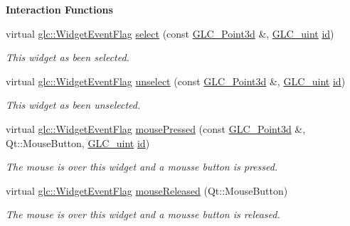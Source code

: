 \begin{Indent}{\bf Interaction Functions}\par
\begin{DoxyCompactItemize}
\item 
virtual \hyperlink{namespaceglc_a7a4a1e3955352aeb2d018746fbe626d5}{glc\-::\-Widget\-Event\-Flag} \hyperlink{class_g_l_c___axis_a9af849a20df4efecbbff677f4741e690}{select} (const \hyperlink{glc__vector3d_8h_a4e13a9bbc7ab3d34de7e98b41836772c}{G\-L\-C\-\_\-\-Point3d} \&, \hyperlink{glc__global_8h_abf950976fabed69026558df8e2da6c6b}{G\-L\-C\-\_\-uint} \hyperlink{glext_8h_a58c2a664503e14ffb8f21012aabff3e9}{id})
\begin{DoxyCompactList}\small\item\em This widget as been selected. \end{DoxyCompactList}\item 
virtual \hyperlink{namespaceglc_a7a4a1e3955352aeb2d018746fbe626d5}{glc\-::\-Widget\-Event\-Flag} \hyperlink{class_g_l_c___axis_a5132ac0942bca529a0f802811670113d}{unselect} (const \hyperlink{glc__vector3d_8h_a4e13a9bbc7ab3d34de7e98b41836772c}{G\-L\-C\-\_\-\-Point3d} \&, \hyperlink{glc__global_8h_abf950976fabed69026558df8e2da6c6b}{G\-L\-C\-\_\-uint} \hyperlink{glext_8h_a58c2a664503e14ffb8f21012aabff3e9}{id})
\begin{DoxyCompactList}\small\item\em This widget as been unselected. \end{DoxyCompactList}\item 
virtual \hyperlink{namespaceglc_a7a4a1e3955352aeb2d018746fbe626d5}{glc\-::\-Widget\-Event\-Flag} \hyperlink{class_g_l_c___axis_a4d8d2ea42e92dbd552bc38e6931ce038}{mouse\-Pressed} (const \hyperlink{glc__vector3d_8h_a4e13a9bbc7ab3d34de7e98b41836772c}{G\-L\-C\-\_\-\-Point3d} \&, Qt\-::\-Mouse\-Button, \hyperlink{glc__global_8h_abf950976fabed69026558df8e2da6c6b}{G\-L\-C\-\_\-uint} \hyperlink{glext_8h_a58c2a664503e14ffb8f21012aabff3e9}{id})
\begin{DoxyCompactList}\small\item\em The mouse is over this widget and a mousse button is pressed. \end{DoxyCompactList}\item 
virtual \hyperlink{namespaceglc_a7a4a1e3955352aeb2d018746fbe626d5}{glc\-::\-Widget\-Event\-Flag} \hyperlink{class_g_l_c___axis_ad73c67df3d65c317d09766aaf95d2b10}{mouse\-Released} (Qt\-::\-Mouse\-Button)
\begin{DoxyCompactList}\small\item\em The mouse is over this widget and a mousse button is released. \end{DoxyCompactList}\item 

\end{DoxyCompactItemize}
\end{Indent}
